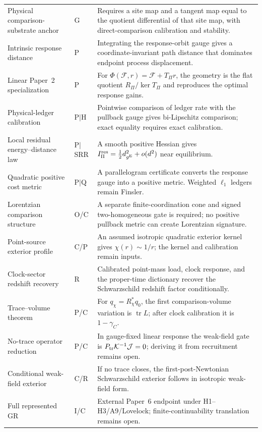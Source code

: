 \documentclass[11pt]{article}
\theoremstyle{remark}
\newcommand{\Status}[1]{\textsf{#1}}
\newcommand{\Ptr}{P_{\rm tr}}
\begin{document}
\begin{longtable}{p{}p{}p{}}
Physical comparison-substrate anchor & \Status{G} & Requires a site map and a tangent map equal to the quotient differential of that site map, with direct-comparison calibration and stability. \\
Intrinsic response distance & \Status{P} & Integrating the response-orbit gauge gives a coordinate-invariant path distance that dominates endpoint process displacement. \\
Linear Paper~2 specialization & \Status{P} & For $\Phi(\mathcal F,r)=\mathcal F+T_\Pi r$, the geometry is the flat quotient $R_\Pi/\ker T_\Pi$ and reproduces the optimal response gains. \\
Physical-ledger calibration & \Status{P$\mid$H} & Pointwise comparison of ledger rate with the pullback gauge gives bi-Lipschitz comparison; exact equality requires exact calibration. \\
Local residual energy--distance law & \Status{P$\mid$SRR} & A smooth positive Hessian gives $I_\Pi^{\rm res}=\tfrac12 d_{g^{\rm E}}^2+o(d^2)$ near equilibrium. \\
Quadratic positive cost metric & \Status{P$\mid$Q} & A parallelogram certificate converts the response gauge into a positive metric.  Weighted $\ell_1$ ledgers remain Finsler. \\
Lorentzian comparison structure & \Status{O/C} & A separate finite-coordination cone and signed two-homogeneous gate is required; no positive pullback metric can create Lorentzian signature. \\
Point-source exterior profile & \Status{C/P} & An assumed isotropic quadratic exterior kernel gives $\chi(r)\sim1/r$; the kernel and calibration remain inputs. \\
Clock-sector redshift recovery & \Status{R} & Calibrated point-mass load, clock response, and the proper-time dictionary recover the Schwarzschild redshift factor conditionally. \\
Trace--volume theorem & \Status{P/C} & For $q_\chi=R_\chi^*q_0$, the first comparison-volume variation is $\operatorname{tr}L$; after clock calibration it is $1-\gamma_C$. \\
No-trace operator reduction & \Status{P/C} & In gauge-fixed linear response the weak-field gate is $\Ptr\mathcal K^{-1}\mathcal J=0$; deriving it from recruitment remains open. \\
Conditional weak-field exterior & \Status{C/R} & If no trace closes, the first-post-Newtonian Schwarzschild exterior follows in isotropic weak-field form. \\
Full represented GR & \Status{I/C} & External Paper~6 endpoint under H1--H3/A9/Lovelock; finite-continuability translation remains open. \\
\bottomrule
\end{longtable}
\end{document}
